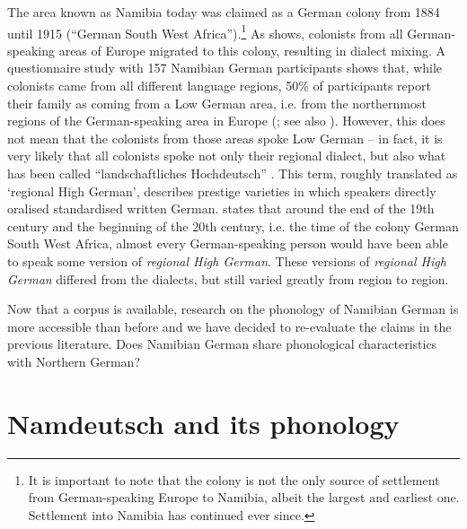 \documentclass[output=paper]{langsci/langscibook}
\begin{document}
The area known as Namibia today was claimed as a German colony from 1884 until 1915 (“German South West Africa”).\footnote{It is important to note that the colony is not the only source of settlement from German-speaking Europe to Namibia, albeit the largest and earliest one. Settlement into Namibia has continued ever since.} As \citet{zimmer_siedlungsgeschichte_nodate} shows, colonists from all German-speaking areas of Europe migrated to this colony, resulting in dialect mixing. A questionnaire study with 157 Namibian German participants shows that, while colonists came from all different language regions, 50\% of participants report their family as coming from a Low German area, i.e. from the northernmost regions of the German-speaking area in Europe (\citealt{zimmer_siedlungsgeschichte_nodate}; see also \citealt{zimmer_wie_nodate}). However, this does not mean that the colonists from those areas spoke Low German – in fact, it is very likely that all colonists spoke not only their regional dialect, but also what has been called “landschaftliches Hochdeutsch” \citep{schmidt_sprachdynamik_2011}. This term, roughly translated as ‘regional High German’, describes prestige varieties in which speakers directly oralised standardised written German. \citet[25]{ganswindt_landschaftliches_2017} states that around the end of the 19th century and the beginning of the 20th century, i.e. the time of the colony German South West Africa, almost every German-speaking person would have been able to speak some version of \textit{regional High German}. These versions of \textit{regional High German} differed from the dialects, but still varied greatly from region to region.

Now that a corpus is available, research on the phonology of Namibian German is more accessible than before and we have decided to re-evaluate the claims in the previous literature. Does Namibian German share phonological characteristics with Northern German?

\section{Namdeutsch and its phonology}
\label{sec:stuhl:2}
\end{document}
